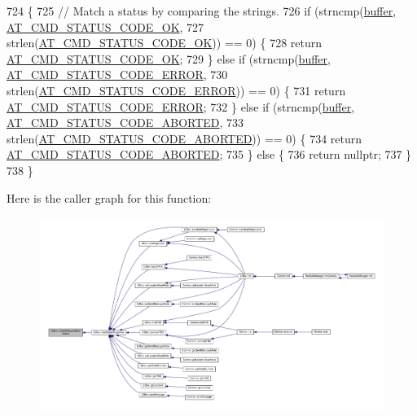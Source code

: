 \begin{DoxyCode}
724 \{
725     \textcolor{comment}{// Match a status by comparing the strings.}
726     \textcolor{keywordflow}{if} (strncmp(\hyperlink{class_u_blox_a6ca4b90f3dc4e856181dce1ebda6f82c}{buffer}, \hyperlink{_u_blox_8cpp_a6ebc1682eb6b9964fccb4a61688ff307}{AT\_CMD\_STATUS\_CODE\_OK},
727                 strlen(\hyperlink{_u_blox_8cpp_a6ebc1682eb6b9964fccb4a61688ff307}{AT\_CMD\_STATUS\_CODE\_OK})) == 0) \{
728         \textcolor{keywordflow}{return} \hyperlink{_u_blox_8cpp_a6ebc1682eb6b9964fccb4a61688ff307}{AT\_CMD\_STATUS\_CODE\_OK};
729     \} \textcolor{keywordflow}{else} \textcolor{keywordflow}{if} (strncmp(\hyperlink{class_u_blox_a6ca4b90f3dc4e856181dce1ebda6f82c}{buffer}, \hyperlink{_u_blox_8cpp_a3dd27f9d4a899cda01354d796683cf9a}{AT\_CMD\_STATUS\_CODE\_ERROR},
730                        strlen(\hyperlink{_u_blox_8cpp_a3dd27f9d4a899cda01354d796683cf9a}{AT\_CMD\_STATUS\_CODE\_ERROR})) == 0) \{
731         \textcolor{keywordflow}{return} \hyperlink{_u_blox_8cpp_a3dd27f9d4a899cda01354d796683cf9a}{AT\_CMD\_STATUS\_CODE\_ERROR};
732     \} \textcolor{keywordflow}{else} \textcolor{keywordflow}{if} (strncmp(\hyperlink{class_u_blox_a6ca4b90f3dc4e856181dce1ebda6f82c}{buffer}, \hyperlink{_u_blox_8cpp_abf37f7ed7586cdbd60130b741a4d50c5}{AT\_CMD\_STATUS\_CODE\_ABORTED},
733                        strlen(\hyperlink{_u_blox_8cpp_abf37f7ed7586cdbd60130b741a4d50c5}{AT\_CMD\_STATUS\_CODE\_ABORTED})) == 0) \{
734         \textcolor{keywordflow}{return} \hyperlink{_u_blox_8cpp_abf37f7ed7586cdbd60130b741a4d50c5}{AT\_CMD\_STATUS\_CODE\_ABORTED};
735     \} \textcolor{keywordflow}{else} \{
736         \textcolor{keywordflow}{return} \textcolor{keyword}{nullptr};
737     \}
738 \}
\end{DoxyCode}
Here is the caller graph for this function\+:\nopagebreak
\begin{figure}[H]
\begin{center}
\leavevmode
\includegraphics[width=350pt]{da/df6/class_u_blox_aab6ad68e4c7522278f19ceab1dc2a58d_icgraph}
\end{center}
\end{figure}
\mbox{\label{class_u_blox_afc846fbcb1cbd49057b5ce39cd0e0dd6}} 

